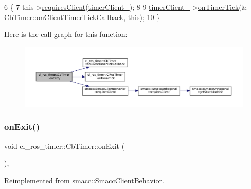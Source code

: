 \begin{DoxyCode}
6 \{
7     this->\hyperlink{classsmacc_1_1SmaccClientBehavior_a917f001e763a1059af337bf4e164f542}{requiresClient}(\hyperlink{classcl__ros__timer_1_1CbTimer_aefff167dbfbc54485f700a2c6b2479a5}{timerClient\_});
8 
9     \hyperlink{classcl__ros__timer_1_1CbTimer_aefff167dbfbc54485f700a2c6b2479a5}{timerClient\_}->\hyperlink{classcl__ros__timer_1_1ClRosTimer_a7edcc057bfb5a25fe0892755137dd8da}{onTimerTick}(&
      \hyperlink{classcl__ros__timer_1_1CbTimer_a9895eb7e05a5922fa27f2bc46f5486a0}{CbTimer::onClientTimerTickCallback}, \textcolor{keyword}{this});
10 \}
\end{DoxyCode}
Here is the call graph for this function\+:
\nopagebreak
\begin{figure}[H]
\begin{center}
\leavevmode
\includegraphics[width=350pt]{classcl__ros__timer_1_1CbTimer_aceba45e86271cf1b7333e2f42c246a38_cgraph}
\end{center}
\end{figure}
\mbox{\label{classcl__ros__timer_1_1CbTimer_a04184e2679c32363c876e1d6b4746072}} 
\subsubsection{\texorpdfstring{on\+Exit()}{onExit()}}
{\footnotesize\ttfamily void cl\+\_\+ros\+\_\+timer\+::\+Cb\+Timer\+::on\+Exit (\begin{DoxyParamCaption}{ }\end{DoxyParamCaption})\hspace{0.3cm}{\ttfamily [override]}, {\ttfamily [virtual]}}



Reimplemented from \hyperlink{classsmacc_1_1SmaccClientBehavior_ac0cd72d42bd00425362a97c9803ecce5}{smacc\+::\+Smacc\+Client\+Behavior}.



